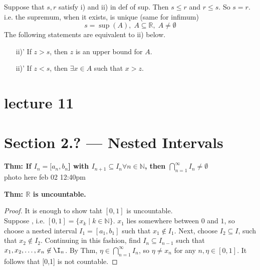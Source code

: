\documentclass{report}
\newcommand{\N}{\mathbb{N}}  %
\newcommand{\bbR}{\mathbb{R}}  %
\theoremstyle{mystyle}
\theoremstyle{customtheorem}
\begin{document}
    Suppose that $s,r$ satisfy i) and ii) in def of sup. Then $s \leq r$ and $r \leq s$. So $s=r$.\\
    i.e. the supremum, when it exists, is unique (same for infimum)
    \[s=\sup(A), \;A \subseteq \bbR,\; A \neq \emptyset \]
    The following statements are equivalent to ii) below. \vspace{-1em} \begin{enumerate}
        \item[ii)'] If $z>s$, then $z$ is  an upper bound for $A$.
        \item[ii)'] If $z < s$, then $\exists x \in A$ such that $x>z$.
    \end{enumerate}

    \pagebreak

    \section*{lecture 11}
    \section*{Section 2.? --- Nested Intervals}
    \textbf{Thm: If $I_n=[a_n,b_n$] with $I_{n+1}\subseteq I_n \forall n \in \N$, then $\bigcap_{n=1}^{\infty} I_n \neq \emptyset$} \\
    photo here feb 02 12:40pm


    \textbf{Thm: $\bbR$ is uncountable.}
    \begin{proof}
        It is enough to show taht $[0,1]$ is uncountable.\\
        Suppose , i.e. $[0,1]=\{x_k \mid k \in \N\}$. $x_1$ lies somewhere between $0$ and $1$, so choose a nested interval $I_1=[a_1,b_1]$ such that $x_1 \not \in I_1$. Next, choose $I_2 \subseteq I$, such that $x_2 \not \in I_2$. Continuing in this fashion, find $I_n\subseteq I_{n-1}$ such that $x_1, x_2, \ldots, x_n\not\in\I_n$. By Thm, $\eta \in \bigcap_{n=1}^\infty I_n$, so $\eta \neq x_n$ for any $n, \eta\in [0,1]$. It follows that [0,1] is not countable.
    \end{proof}
\end{document}
